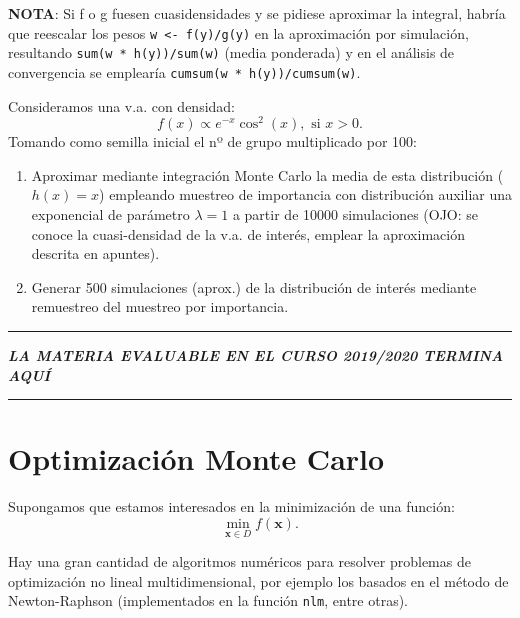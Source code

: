 \documentclass[
]{book}
\theoremstyle{break}
\theoremstyle{definition}
\theoremstyle{definition}
\theoremstyle{definition}
\theoremstyle{remark}
\let\BeginKnitrBlock\begin \let\EndKnitrBlock\end
\begin{document}
\textbf{NOTA}: Si f o g fuesen cuasidensidades y se pidiese aproximar la integral, habría que reescalar los pesos \texttt{w\ \textless{}-\ f(y)/g(y)} en la aproximación por simulación, resultando \texttt{sum(w\ *\ h(y))/sum(w)} (media ponderada) y en el análisis de convergencia se emplearía \texttt{cumsum(w\ *\ h(y))/cumsum(w)}.

\BeginKnitrBlock{exercise}[propuesto]
\protect\hypertarget{exr:mc-imp-sample2}{}{\label{exr:mc-imp-sample2} {} }
\EndKnitrBlock{exercise}

Consideramos una v.a. con densidad:
\[f(x)\propto e^{-x}\cos^{2}(x),\text{ si }x>0.\]
Tomando como semilla inicial el nº de grupo multiplicado por 100:

\begin{enumerate}
\def\labelenumi{\alph{enumi}.}
\item
  Aproximar mediante integración Monte Carlo la media de esta
  distribución (\(h(x)=x\)) empleando muestreo de importancia con
  distribución auxiliar una exponencial de parámetro \(\lambda=1\) a
  partir de 10000 simulaciones (OJO: se conoce la cuasi-densidad
  de la v.a. de interés, emplear la aproximación descrita
  en apuntes).
\item
  Generar 500 simulaciones (aprox.) de la distribución de interés
  mediante remuestreo del muestreo por importancia.
\end{enumerate}

\begin{center}\rule{0.5\linewidth}{0.5pt}\end{center}

\textbf{\emph{LA MATERIA EVALUABLE EN EL CURSO 2019/2020 TERMINA AQUÍ}}

\begin{center}\rule{0.5\linewidth}{0.5pt}\end{center}

\hypertarget{optimizaciuxf3n-monte-carlo}{%
\section{Optimización Monte Carlo}\label{optimizaciuxf3n-monte-carlo}}

Supongamos que estamos interesados en la minimización de una función:
\[\underset{\mathbf{x}\in D}{\min }f(\mathbf{x}).\]

Hay una gran cantidad de algoritmos numéricos para resolver problemas de optimización no lineal multidimensional, por ejemplo los basados en el método de Newton-Raphson
(implementados en la función \texttt{nlm}, entre otras).
\end{document}
